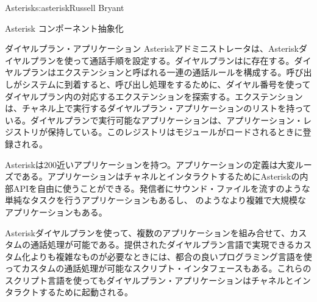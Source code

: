 \begin{aosachapter}{Asterisk}{s:asterisk}{Russell Bryant}
\begin{aosasect1}{Asterisk コンポーネント抽象化}
\begin{aosasect2}{ダイヤルプラン・アプリケーション}
Asteriskアドミニストレータは、Asteriskダイヤルプランを使って通話手順を設定する。ダイヤルプランはに存在する。ダイヤルプランはエクステンションと呼ばれる一連の通話ルールを構成する。呼び出しがシステムに到着すると、呼び出し処理をするために、ダイヤル番号を使ってダイヤルプラン内の対応するエクステンションを探索する。エクステンションは、チャネル上で実行するダイヤルプラン・アプリケーションのリストを持っている。ダイヤルプランで実行可能なアプリケーションは、アプリケーション・レジストリが保持している。このレジストリはモジュールがロードされるときに登録される。

Asteriskは200近いアプリケーションを持つ。アプリケーションの定義は大変ルーズである。アプリケーションはチャネルとインタラクトするためにAsteriskの内部APIを自由に使うことができる。発信者にサウンド・ファイルを流すのような単純なタスクを行うアプリケーションもあるし、 のようなより複雑で大規模なアプリケーションもある。

Asteriskダイヤルプランを使って、複数のアプリケーションを組み合せて、カスタムの通話処理が可能である。提供されたダイヤルプラン言語で実現できるカスタム化よりも複雑なものが必要なときには、都合の良いプログラミング言語を使ってカスタムの通話処理が可能なスクリプト・インタフェースもある。これらのスクリプト言語を使ってもダイヤルプラン・アプリケーションはチャネルとインタラクトするために起動される。


\end{aosasect2}
\end{aosasect1}
\end{aosachapter}
